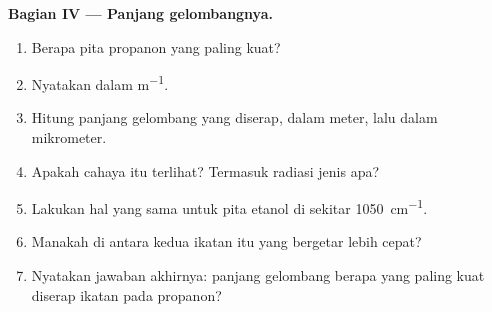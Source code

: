 \begin{problem}
\medskip
\noindent\textbf{Bagian IV --- Panjang gelombangnya.}
\begin{enumerate}[resume]
  \item Berapa  pita propanon yang paling kuat?
  \item Nyatakan dalam \si{m^{-1}}.
  \item Hitung panjang gelombang yang diserap, dalam meter, lalu dalam
        mikrometer.
  \item Apakah cahaya itu terlihat? Termasuk radiasi jenis apa?
  \item Lakukan hal yang sama untuk pita  etanol di sekitar
        \qty{1050}{cm^{-1}}.
  \item Manakah di antara kedua ikatan itu yang bergetar lebih cepat?
  \item Nyatakan jawaban akhirnya: panjang gelombang berapa yang paling
        kuat diserap ikatan  pada propanon?
\end{enumerate}
\end{problem}
